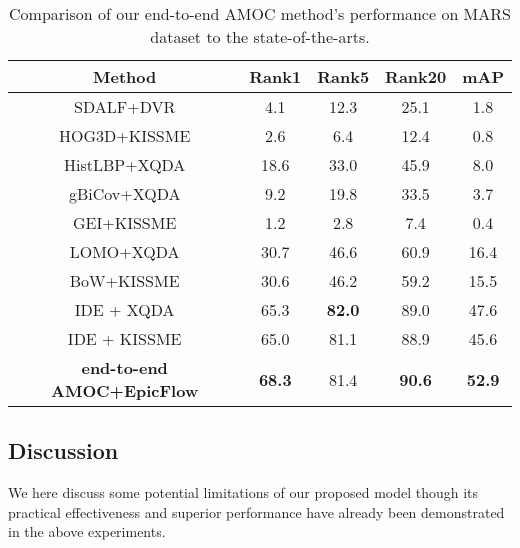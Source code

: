 \documentclass[journal]{IEEEtran}
\begin{document}
\begin{table}[htbp]
	\centering
	\caption{Comparison of our end-to-end AMOC method’s performance on MARS dataset to the state-of-the-arts.}
	\begin{tabular}{c|ccc|c}
		\hline
	
		\textbf{Method} & \textbf{Rank1} & \textbf{Rank5}& \textbf{Rank20}& \textbf{mAP}\\
		\hline
		SDALF\cite{farenzena2010person}+DVR\cite{wang2016person}  & 4.1 & 12.3 &25.1 &1.8\\
	    HOG3D\cite{Kl2008A}+KISSME\cite{K2012Large} &2.6&6.4&12.4&0.8\\
	    HistLBP\cite{xiong2014person}+XQDA\cite{liao2015person}	&18.6&33.0&45.9&8.0\\
		gBiCov\cite{ma2014covariance}+XQDA                                &9.2&19.8&33.5&3.7\\
	   GEI\cite{Han2005Individual}+KISSME  &1.2 &2.8 &7.4 &0.4\\
		LOMO\cite{liao2015person}+XQDA &30.7&46.6&60.9&16.4\\
		BoW\cite{zheng2015scalable}+KISSME &30.6&46.2&59.2&15.5\\
		IDE\cite{zheng2016person}  + XQDA  &65.3 &\textbf{82.0} &{89.0} &47.6\\
		IDE + KISSME &65.0	&{81.1}	&{88.9}	&45.6\\
		\hline
		\textbf{end-to-end AMOC+EpicFlow} & \textbf{68.3} & 81.4 &\textbf{90.6}&\textbf{52.9}\\
		\hline
	\end{tabular}%
	\label{tab:mars}%
\end{table}%

\subsection{Discussion}
We here discuss some potential limitations of our proposed model though its practical  effectiveness and superior performance have already been demonstrated in the above experiments.  
\end{document}
